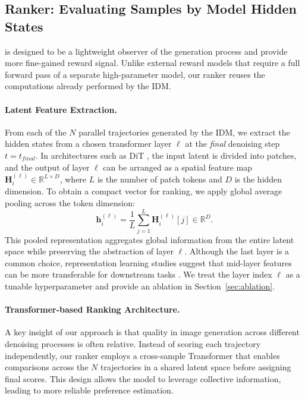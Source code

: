 \documentclass{article}
\newcommand{\method}{\text{Diffusion Ranker}\xspace}
\begin{document}
\subsection{Ranker: Evaluating Samples by Model Hidden States}
\label{sec:ranker}

\method is designed to be a lightweight observer of the generation process and provide more fine-gained reward signal. Unlike external reward models that require a full forward pass of a separate high-parameter model, our ranker reuses the computations already performed by the IDM.

\paragraph{Latent Feature Extraction.}

From each of the $N$ parallel trajectories generated by the IDM, we extract the hidden states from a chosen transformer layer $\ell$ at the \emph{final} denoising step $t=t_{final}$. In architectures such as DiT \citep{peebles2023dit}, the input latent is divided into patches, and the output of layer $\ell$ can be arranged as a spatial feature map $\mathbf{H}_i^{(\ell)} \in \mathbb{R}^{L \times D}$, where $L$ is the number of patch tokens and $D$ is the hidden dimension. To obtain a compact vector for ranking, we apply global average pooling across the token dimension:
\begin{equation}
    \mathbf{h}_i^{(\ell)} = \frac{1}{L} \sum_{j=1}^{L} \mathbf{H}_i^{(\ell)}[j] \in \mathbb{R}^{D}.
\label{eq:h}
\end{equation}
This pooled representation aggregates global information from the entire latent space while preserving the abstraction of layer $\ell$. Although the last layer is a common choice, representation learning studies suggest that mid-layer features can be more transferable for downstream tasks \citep{skean2024does}. We treat the layer index $\ell$ as a tunable hyperparameter and provide an ablation in Section~\ref{sec:ablation}.

\paragraph{Transformer-based Ranking Architecture.}

A key insight of our approach is that quality in image generation across different denoising processes is often relative. Instead of scoring each trajectory independently, our ranker employs a cross-sample Transformer that enables comparisons across the $N$ trajectories in a shared latent space before assigning final scores. This design allows the model to leverage collective information, leading to more reliable preference estimation.
\end{document}
